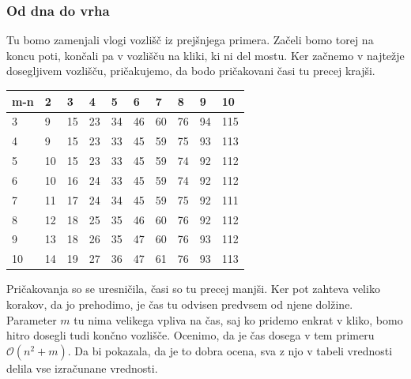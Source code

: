 \documentclass[12pt,a4paper]{amsart}
\begin{document}
\subsubsection{Od dna do vrha}

Tu bomo zamenjali vlogi vozlišč iz prejšnjega primera. Začeli bomo torej na koncu poti, končali pa v vozlišču na 
kliki, ki ni del mostu. Ker začnemo v najtežje dosegljivem vozlišču, pričakujemo, da bodo pričakovani časi tu precej
krajši.

\begin{table}[!ht]
    \centering
    \begin{tabular}{|l|l|l|l|l|l|l|l|l|l|}
    \hline
        m-n & 2 & 3 & 4 & 5 & 6 & 7 & 8 & 9 & 10 \\ \hline
        3 & 9 & 15 & 23 & 34 & 46 & 60 & 76 & 94 & 115 \\ \hline
        4 & 9 & 15 & 23 & 33 & 45 & 59 & 75 & 93 & 113 \\ \hline
        5 & 10 & 15 & 23 & 33 & 45 & 59 & 74 & 92 & 112 \\ \hline
        6 & 10 & 16 & 24 & 33 & 45 & 59 & 74 & 92 & 112 \\ \hline
        7 & 11 & 17 & 24 & 34 & 45 & 59 & 75 & 92 & 111 \\ \hline
        8 & 12 & 18 & 25 & 35 & 46 & 60 & 76 & 92 & 112 \\ \hline
        9 & 13 & 18 & 26 & 35 & 47 & 60 & 76 & 93 & 112 \\ \hline
        10 & 14 & 19 & 27 & 36 & 47 & 61 & 76 & 93 & 113 \\ \hline
    \end{tabular}
\end{table}

Pričakovanja so se uresničila, časi so tu precej manjši. Ker pot zahteva veliko korakov, da jo prehodimo, je čas tu
odvisen predvsem od njene dolžine. Parameter $m$ tu nima velikega vpliva na čas, saj ko pridemo enkrat v kliko, bomo
hitro dosegli tudi končno vozlišče. Ocenimo, da je čas dosega v tem primeru $\mathcal{O}(n^2+m)$. Da bi pokazala, da 
je to dobra ocena, sva z njo v tabeli vrednosti delila vse izračunane vrednosti.
\end{document}
